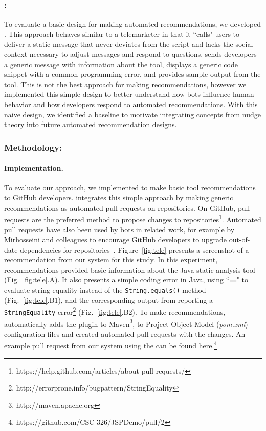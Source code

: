 \subsubsection{\tele:}

To evaluate a basic design for making automated recommendations, we developed \tele. This approach behaves similar to a telemarketer in that it ``calls" users to deliver a static message that never deviates from the script and lacks the social context necessary to adjust messages and respond to questions. \tele sends developers a generic message with information about the tool, displays a generic code snippet with a common programming error, and provides sample output from the tool. This is not the best approach for making recommendations, however we implemented this simple design to better understand how bots influence human behavior and how developers respond to automated recommendations. With this naive design, we identified a baseline to motivate integrating concepts from nudge theory into future automated recommendation designs. 

\subsubsection{Methodology:}

\paragraph{Implementation.} To evaluate our \tele approach, we implemented \tool to make basic tool recommendations to GitHub developers. \tool integrates this simple approach by making generic recommendations as automated pull requests on repositories. On GitHub, pull requests are the preferred method to propose changes to repositories\footnote{https://help.github.com/articles/about-pull-requests/}. Automated pull requests have also been used by bots in related work, for example by Mirhosseini and colleagues to encourage GitHub developers to upgrade out-of-date dependencies for repositories~\cite{SamUgrade}. Figure~\ref{fig:tele} presents a screenshot of a recommendation from our system for this study. In this experiment, \tool recommendations provided basic information about the Java static analysis tool \EP  (Fig.~\ref{fig:tele}.A). It also presents a simple coding error in Java, using ``\texttt{==}" to evaluate string equality instead of the \texttt{String.equals()} method (Fig.~\ref{fig:tele}.B1), and the corresponding output from \EP reporting a \texttt{StringEquality} error\footnote{http://errorprone.info/bugpattern/StringEquality} (Fig.~\ref{fig:tele}.B2). To make recommendations, \tool automatically adds the \EP plugin to Maven\footnote{http://maven.apache.org}, to Project Object Model (\textit{pom.xml}) configuration files and created automated pull requests with the changes. An example pull request from our system using the \tele can be found here.\footnote{https://github.com/CSC-326/JSPDemo/pull/2}

